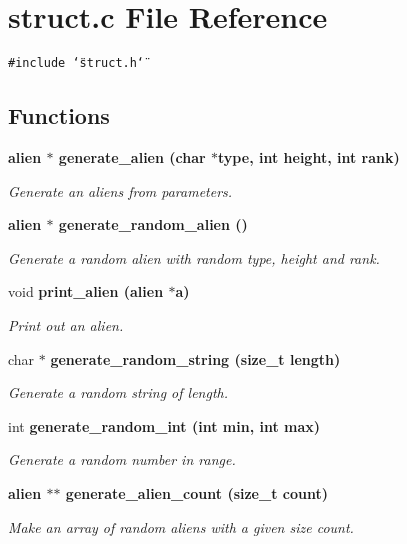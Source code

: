 \section{struct.c File Reference}
\label{struct_8c}
{\tt \#include \char`\"{}struct.h\char`\"{}}\par
\subsection*{Functions}
\begin{CompactItemize}
\item 
\bf{alien} $\ast$ \bf{generate\_\-alien} (char $\ast$type, int height, int rank)
\begin{CompactList}\small\item\em Generate an aliens from parameters. \item\end{CompactList}\item 
\bf{alien} $\ast$ \bf{generate\_\-random\_\-alien} ()
\begin{CompactList}\small\item\em Generate a random alien with random type, height and rank. \item\end{CompactList}\item 
void \bf{print\_\-alien} (\bf{alien} $\ast$a)
\begin{CompactList}\small\item\em Print out an alien. \item\end{CompactList}\item 
char $\ast$ \bf{generate\_\-random\_\-string} (size\_\-t length)
\begin{CompactList}\small\item\em Generate a random string of length. \item\end{CompactList}\item 
int \bf{generate\_\-random\_\-int} (int min, int max)
\begin{CompactList}\small\item\em Generate a random number in range. \item\end{CompactList}\item 
\bf{alien} $\ast$$\ast$ \bf{generate\_\-alien\_\-count} (size\_\-t count)
\begin{CompactList}\small\item\em Make an array of random aliens with a given size count. \item\end{CompactList}\item 
$$
\end{CompactItemize}
